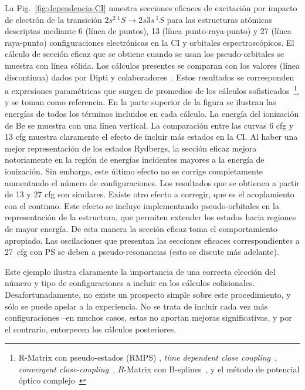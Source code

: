 La Fig.~\ref{fig:dependencia-CI} muestra secciones eficaces de 
excitación por impacto de electrón de la transición 
$2s^2\,^1S\rightarrow 2s3s\,^1S$ para las estructuras atómicas 
descriptas mediante 6 (línea de puntos), 13 (línea punto-raya-punto) y 
27 (línea raya-punto) configuraciones electrónicas en la CI y 
orbitales espectroscópicos. El cálculo de sección eficaz que se obtiene 
cuando se usan los pseudo-orbitales se muestra con línea sólida. 
Los cálculos presentes se comparan con los valores (línea discontinua) 
dados por Dipti y colaboradores~\cite{Dipti:19}. Estos resultados se 
corresponden a expresiones paramétricas que surgen de promedios de los 
cálculos sofisticados~\footnote{R-Matrix con pseudo-estados (RMPS) 
\cite{Be_Ballance:03,Bartschat:97}, \textit{time dependent close 
coupling}~\cite{Colgan:03}, \textit{convergent 
close-coupling}~\cite{Fursa:97,Bray:15}, $R$-Matrix con 
B-splines~\cite{Zatsarinny:16}, y el método de potencial óptico 
complejo~\cite{Blanco:17}}, y se toman como referencia. 
En la parte superior de la figura se ilustran las energías de todos los 
términos incluidos en cada cálculo. La energía del ionización de Be se 
muestra con una línea vertical. 
La comparación entre las curvas 6 cfg y 13 cfg muestra claramente el 
efecto de incluir más estados en la CI. Al haber una mejor 
representación de los estados Rydbergs, la sección eficaz mejora 
notoriamente en la región de energías incidentes mayores a la energía de 
ionización. Sin embargo, este último efecto no se corrige completamente
aumentando el número de configuraciones. Los resultados que se obtienen
a partir de 13 y 27 cfg son similares. Existe otro efecto a corregir, 
que es el acoplamiento con el continuo. Este efecto se incluye 
implementando pseudo-orbitales en la representación de la estructura, 
que permiten extender los estados hacia regiones de mayor energía. De 
esta manera la sección eficaz toma el comportamiento apropiado. Las 
oscilaciones que presentan las secciones eficaces correspondientes a 
27~cfg con PS se deben a pseudo-resonancias (esto se discute más 
adelante). 

Este ejemplo ilustra claramente la importancia de una correcta elección 
del número y tipo de configuraciones a incluir en los cálculos 
colisionales. Desafortunadamente, no existe un prospecto simple sobre 
este procedimiento, y sólo se puede apelar a la experiencia. No se trata 
de incluir cada vez más configuraciones --en muchos casos, estas no 
aportan mejoras significativas, y por el contrario, entorpecen los 
cálculos posteriores. 

